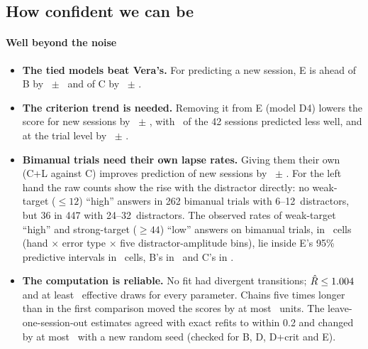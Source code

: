 \subsection{How confident we can be}
\paragraph{Well beyond the noise}
\begin{itemize}
\item \textbf{The tied models beat Vera's.} For predicting a new session, E is ahead of B by \cnEminusBLoso\ $\pm$ \cnBvsELosoSE\ and of C by \cnEminusCLoso\ $\pm$ \cnCvsELosoSE.
\item \textbf{The criterion trend is needed.} Removing it from E (model D4) lowers the score for new sessions by \cnTrendLoso\ $\pm$ \cnTrendLosoSE, with \cnTrendNbetter\ of the 42 sessions predicted less well, and at the trial level by \cnTrendTrial\ $\pm$ \cnTrendTrialSE.
\item \textbf{Bimanual trials need their own lapse rates.} Giving them their own (C+L against C) improves prediction of new sessions by \cnLapseLoso\ $\pm$ \cnLapseLosoSE.
For the left hand the raw counts show the rise with the distractor directly: no weak-target ($\le 12$\um) ``high'' answers in 262 bimanual trials with 6--12\um\ distractors, but 36 in 447 with 24--32\um\ distractors.
The observed rates of weak-target ``high'' and strong-target ($\ge 44$\um) ``low'' answers on bimanual trials, in \ppcN\ cells (hand $\times$ error type $\times$ five distractor-amplitude bins), lie inside E's 95\% predictive intervals in \ppcInE\ cells, B's in \ppcInB\ and C's in \ppcInC.
\item \textbf{The computation is reliable.} No fit had divergent transitions; $\hat R\le1.004$ and at least \minEssAll\ effective draws for every parameter. Chains five times longer than in the first comparison moved the scores by at most \drawsMaxTrial\ units. The leave-one-session-out estimates agreed with exact refits to within 0.2 and changed by at most \losoSeedMax\ with a new random seed (checked for B, D, D+crit and E).
\end{itemize}
